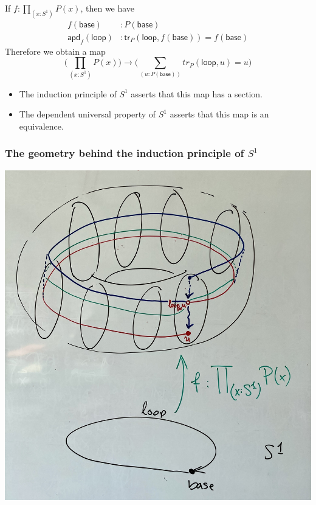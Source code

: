 \documentclass[handout]{beamer}
\newcommand{\sphere}[1]{S^{#1}}
\newcommand{\baseS}{\mathsf{base}}
\newcommand{\loopS}{\mathsf{loop}}
\newcommand{\apd}{\mathsf{apd}}
\newcommand{\tr}{\mathsf{tr}}
\newcommand{\apply}[2]{#1(#2)}
\begin{document}
\begin{frame}
  If $f:\prod_{(x:\sphere{1})}\apply{P}{x}$, then we have
  \begin{align*}
    \apply{f}{\baseS} & : \apply{P}{\baseS} \\
    \apply{\apd_f}{\loopS} & : \apply{\tr_P}{\loopS,\apply{f}{\baseS}}= \apply{f}{\baseS}
  \end{align*}\pause
  Therefore we obtain a map
  \begin{equation*}
    \Big(\prod_{(x:\sphere{1})}\apply{P}{x}\Big)\to\Big(\sum_{(u:\apply{P}{\baseS})}\apply{tr_P}{\loopS,u}=u\Big)
  \end{equation*}\pause
  \begin{itemize}
  \item The induction principle of $\sphere{1}$ asserts that this map has a section.
  \item The dependent universal property of $\sphere{1}$ asserts that this map is an equivalence.
  \end{itemize}
\end{frame}

\begin{frame}
  \frametitle{The geometry behind the induction principle of $\sphere{1}$}
  \begin{center}
    \includegraphics[width=.7\textwidth]{circle-induction}
  \end{center}
\end{frame}
\end{document}
